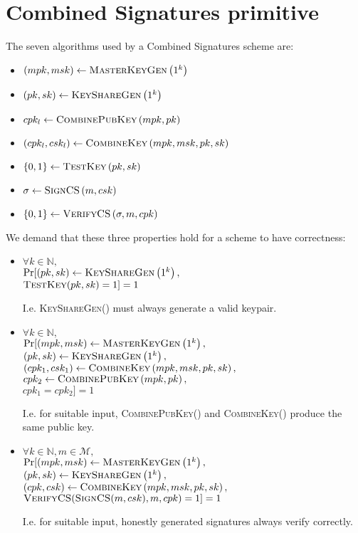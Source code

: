 \section{Combined Signatures primitive}
  \label{appendix:combinedsign}

  The seven algorithms used by a Combined Signatures scheme are:
  \begin{itemize}
    \item $\left(mpk, msk\right) \gets \textsc{MasterKeyGen}\left(1^k\right)$
    \item $\left(pk, sk\right) \gets \textsc{KeyShareGen}\left(1^k\right)$
    \item $cpk_l \gets \textsc{CombinePubKey}\left(mpk, pk\right)$
    \item $\left(cpk_l, csk_l\right) \gets \textsc{CombineKey}\left(mpk,
    msk, pk, sk\right)$
    \item $\{0, 1\} \gets \textsc{TestKey}\left(pk, sk\right)$
    \item $\sigma \gets \textsc{SignCS}\left(m, csk\right)$
    \item $\left\{0, 1\right\} \gets \textsc{VerifyCS}\left(\sigma, m,
    cpk\right)$
  \end{itemize}
  We demand that these three properties hold for a scheme to have correctness:
  \begin{itemize}
    \item $\forall k \in \mathbb{N},$ \\
    $\Pr[\left(pk, sk\right) \gets \textsc{KeyShareGen}\left(1^k\right),$ \\
    $\textsc{TestKey}(pk, sk) = 1] = 1$

    I.e. \textsc{KeyShareGen}() must always generate a valid keypair.

    \item $\forall k \in \mathbb{N},$ \\
    $\Pr[(mpk, msk) \gets \textsc{MasterKeyGen}\left(1^k\right),$ \\
    $\left(pk, sk\right) \gets \textsc{KeyShareGen}\left(1^k\right),$ \\
    $\left(cpk_1, csk_1\right) \gets \textsc{CombineKey}\left(mpk, msk, pk,
    sk\right),$ \\
    $cpk_2 \gets \textsc{CombinePubKey}\left(mpk, pk\right),$ \\
    $cpk_1 = cpk_2] = 1$

    I.e. for suitable input, \textsc{CombinePubKey}() and \textsc{CombineKey}()
    produce the same public key.

    \item $\forall k \in \mathbb{N}, m \in \mathcal{M},$ \\
    $\Pr[(mpk, msk) \gets \textsc{MasterKeyGen}\left(1^k\right),$ \\
    $\left(pk, sk\right) \gets \textsc{KeyShareGen}\left(1^k\right),$ \\
    $\left(cpk, csk\right) \gets \textsc{CombineKey}\left(mpk, msk, pk,
    sk\right),$ \\
    $\textsc{VerifyCS}(\textsc{SignCS}(m, csk), m, cpk) = 1] = 1$

    I.e. for suitable input, honestly generated signatures always verify
    correctly.
  \end{itemize}
